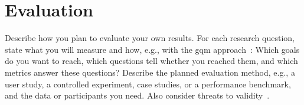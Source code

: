 \section{Evaluation}\label{sec:expose:evaluation}

Describe how you plan to evaluate your own results.
For each research question, state what you will measure and how, e.g., with the \gls{gqm} approach~\cite{Basili1994}:
Which goals do you want to reach, which questions tell whether you reached them, and which metrics answer these questions?
Describe the planned evaluation method, e.g., a user study, a controlled experiment, case studies, or a performance benchmark, and the data or participants you need.
Also consider threats to validity~\cite{Runeson2009}.
